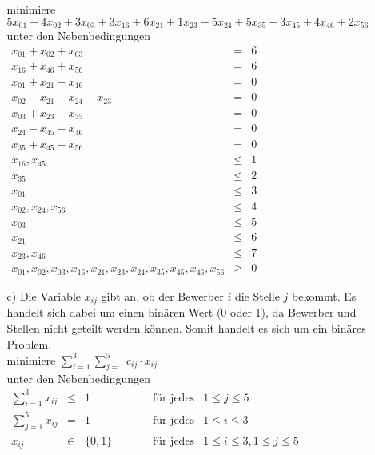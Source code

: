 \documentclass[a4paper,11pt]{article}
\begin{document}
\begin{enumerate}
\begin{enumerate}
        minimiere \( 5x_{01} + 4x_{02} + 3x_{03} + 3x_{16} + 6x_{21} + 1x_{23} + 5x_{24} + 5x_{35} + 3x_{45} + 4x_{46} + 2x_{56} \)\\
        unter den Nebenbedingungen\\
        \(\begin{array}{rcr}
            x_{01} + x_{02} + x_{03} &=& 6\\
            x_{16} + x_{46} + x_{56} &=& 6\\
            x_{01} + x_{21} - x_{16} &=& 0\\
            x_{02} - x_{21} - x_{24} - x_{23} &=& 0\\
            x_{03} + x_{23} - x_{35} &=& 0\\
            x_{24} - x_{45} - x_{46} &=& 0\\
            x_{35} + x_{45} - x_{56} &=& 0\\
            x_{16}, x_{45} &\leq& 1\\
            x_{35} &\leq& 2\\
            x_{01} &\leq& 3\\
            x_{02}, x_{24}, x_{56} &\leq& 4\\
            x_{03} &\leq& 5\\
            x_{21} &\leq& 6\\
            x_{23}, x_{46} &\leq& 7\\

            x_{01}, x_{02}, x_{03}, x_{16}, x_{21}, x_{23}, x_{24}, x_{35}, x_{45}, x_{46}, x_{56} &\geq& 0
        \end{array}\)

    \item[c)]
        Die Variable $x_{ij}$ gibt an, ob der Bewerber $i$ die Stelle $j$ bekommt.
        Es handelt sich dabei um einen binären Wert (0 oder 1), da Bewerber und
        Stellen nicht geteilt werden können. Somit handelt es sich um ein
        binäres Problem. \\[1em]

        minimiere $\sum\limits_{i=1}^3\sum\limits_{j=1}^5 c_{ij} \cdot x_{ij}$\\
        unter den Nebenbedingungen\\
        \(\begin{array}{rclll}
            \sum\limits_{i=1}^3 x_{ij} &\leq& 1 \hspace{2cm} & \text{für jedes} & 1 \leq j \leq 5\\
            \sum\limits_{j=1}^5 x_{ij} &=& 1 & \text{für jedes} & 1 \leq i \leq 3 \\
            x_{ij} &\in& \{0, 1\} & \text{für jedes} & 1 \leq i \leq 3, 1 \leq j \leq 5\\
        \end{array}\)


\end{enumerate}
\end{enumerate}
\end{document}
